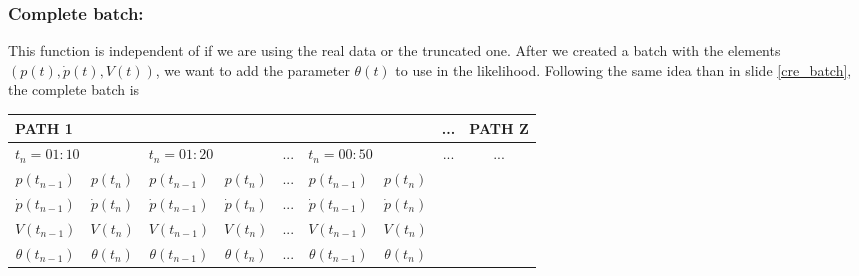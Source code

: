 \documentclass[aspectratio=169]{beamer}\usepackage[utf8]{inputenc}
\begin{document}

\begin{frame}\frametitle{Complete batch:}
{\footnotesize
\alert{This function is independent of if we are using the real data or the truncated one.} After we created a batch with the elements $(p(t),\dot{p}(t),V(t))$, we want to add the parameter $\theta(t)$ to use in the likelihood. Following the same idea than in slide {\color{blue}\ref{cre_batch}}, the complete batch is
\begin{table}[]
\begin{tabular}{|c|c|c|c|c|c|c|c|c|}
\hline
\multicolumn{7}{|l|}{PATH 1}                                                                                       & ...                  & PATH Z               \\ \hline
\multicolumn{2}{|l|}{$t_n=01:10$}   & \multicolumn{2}{l|}{$t_n=01:20$}    & ... & \multicolumn{2}{l|}{$t_n=00:50$} & \multirow{4}{*}{...} & \multirow{4}{*}{...} \\ \cline{1-7}
$p(t_{n-1})$      & $p(t_{n})$      & $p(t_{n-1})$      & $p(t_{n})$      & ... & $p(t_{n-1})$     & $p(t_{n})$    &                      &                      \\ \cline{1-7}
$\dot{p}(t_{n-1})$ & $\dot{p}(t_{n})$ & $\dot{p}(t_{n-1})$ & $\dot{p}(t_{n})$ & ... & $\dot{p}(t_{n-1})$     & $\dot{p}(t_{n})$    &                      &                      \\ \cline{1-7}

$V(t_{n-1})$      & $V(t_{n})$      & $V(t_{n-1})$      & $V(t_{n})$      & ... & $V(t_{n-1})$     & $V(t_{n})$    &                      &                      \\ \hline
$\theta(t_{n-1})$      & $\theta(t_{n})$      & $\theta(t_{n-1})$      & $\theta(t_{n})$      & ... & $\theta(t_{n-1})$     & $\theta(t_{n})$    &                      &                      \\ \hline

\end{tabular}
\end{table}
\begin{center}
\begin{tabular}{|c|}
\toprule
{\tiny

}\\
\bottomrule
\end{tabular}
\end{center}}

\end{frame}
\end{document}
